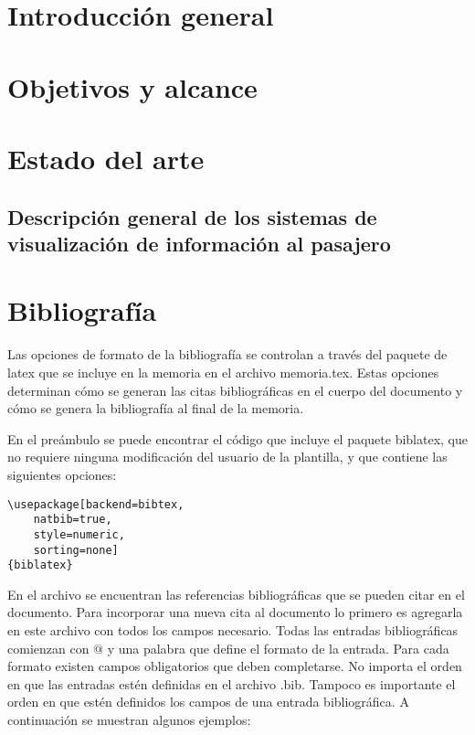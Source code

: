 

\pagebreak
\section{Introducción general}

\pagebreak
\section{Objetivos y alcance}

\pagebreak
\section{Estado del arte}
\subsection{Descripción general de los sistemas de visualización de información al pasajero}

\pagebreak
\section{Bibliografía}
\label{sec:biblio}

Las opciones de formato de la bibliografía se controlan a través del paquete de latex  que se incluye en la memoria en el archivo memoria.tex.  Estas opciones determinan cómo se generan las citas bibliográficas en el cuerpo del documento y cómo se genera la bibliografía al final de la memoria.

En el preámbulo se puede encontrar el código que incluye el paquete biblatex, que no requiere ninguna modificación del usuario de la plantilla, y que contiene las siguientes opciones:

\begin{lstlisting}
\usepackage[backend=bibtex,
	natbib=true, 
	style=numeric, 
	sorting=none]
{biblatex}
\end{lstlisting}

En el archivo  se encuentran las referencias bibliográficas que se pueden citar en el documento.  Para incorporar una nueva cita al documento lo primero es agregarla en este archivo con todos los campos necesario.  Todas las entradas bibliográficas comienzan con $@$ y una palabra que define el formato de la entrada.  Para cada formato existen campos obligatorios que deben completarse. No importa el orden en que las entradas estén definidas en el archivo .bib.  Tampoco es importante el orden en que estén definidos los campos de una entrada bibliográfica. A continuación se muestran algunos ejemplos:

